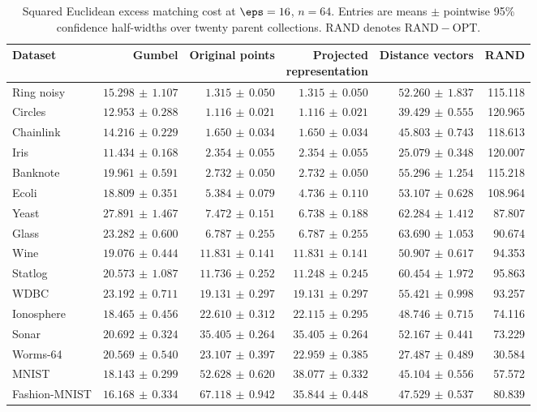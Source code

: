 \begin{table}[p]
\centering\scriptsize
\setlength{\tabcolsep}{3pt}
\caption{Squared Euclidean excess matching cost at $\eps=16$, $n=64$. Entries are means $\pm$ pointwise 95\% confidence half-widths over twenty parent collections. RAND denotes $\mathrm{RAND}-\mathrm{OPT}$.}
\label{tab:exp-bench-p2-eps16}
\begin{tabular}{lrrrrr}
\toprule
Dataset & Gumbel & Original points & \shortstack{Projected\\representation} & Distance vectors & RAND\\
\midrule
Ring noisy & $15.298\,\pm\,1.107$ & $1.315\,\pm\,0.050$ & $1.315\,\pm\,0.050$ & $52.260\,\pm\,1.837$ & 115.118\\
Circles & $12.953\,\pm\,0.288$ & $1.116\,\pm\,0.021$ & $1.116\,\pm\,0.021$ & $39.429\,\pm\,0.555$ & 120.965\\
Chainlink & $14.216\,\pm\,0.229$ & $1.650\,\pm\,0.034$ & $1.650\,\pm\,0.034$ & $45.803\,\pm\,0.743$ & 118.613\\
Iris & $11.434\,\pm\,0.168$ & $2.354\,\pm\,0.055$ & $2.354\,\pm\,0.055$ & $25.079\,\pm\,0.348$ & 120.007\\
Banknote & $19.961\,\pm\,0.591$ & $2.732\,\pm\,0.050$ & $2.732\,\pm\,0.050$ & $55.296\,\pm\,1.254$ & 115.218\\
Ecoli & $18.809\,\pm\,0.351$ & $5.384\,\pm\,0.079$ & $4.736\,\pm\,0.110$ & $53.107\,\pm\,0.628$ & 108.964\\
Yeast & $27.891\,\pm\,1.467$ & $7.472\,\pm\,0.151$ & $6.738\,\pm\,0.188$ & $62.284\,\pm\,1.412$ & 87.807\\
Glass & $23.282\,\pm\,0.600$ & $6.787\,\pm\,0.255$ & $6.787\,\pm\,0.255$ & $63.690\,\pm\,1.053$ & 90.674\\
Wine & $19.076\,\pm\,0.444$ & $11.831\,\pm\,0.141$ & $11.831\,\pm\,0.141$ & $50.907\,\pm\,0.617$ & 94.353\\
Statlog & $20.573\,\pm\,1.087$ & $11.736\,\pm\,0.252$ & $11.248\,\pm\,0.245$ & $60.454\,\pm\,1.972$ & 95.863\\
WDBC & $23.192\,\pm\,0.711$ & $19.131\,\pm\,0.297$ & $19.131\,\pm\,0.297$ & $55.421\,\pm\,0.998$ & 93.257\\
Ionosphere & $18.465\,\pm\,0.456$ & $22.610\,\pm\,0.312$ & $22.115\,\pm\,0.295$ & $48.746\,\pm\,0.715$ & 74.116\\
Sonar & $20.692\,\pm\,0.324$ & $35.405\,\pm\,0.264$ & $35.405\,\pm\,0.264$ & $52.167\,\pm\,0.441$ & 73.229\\
Worms-64 & $20.569\,\pm\,0.540$ & $23.107\,\pm\,0.397$ & $22.959\,\pm\,0.385$ & $27.487\,\pm\,0.489$ & 30.584\\
MNIST & $18.143\,\pm\,0.299$ & $52.628\,\pm\,0.620$ & $38.077\,\pm\,0.332$ & $45.104\,\pm\,0.556$ & 57.572\\
Fashion-MNIST & $16.168\,\pm\,0.334$ & $67.118\,\pm\,0.942$ & $35.844\,\pm\,0.448$ & $47.529\,\pm\,0.537$ & 80.839\\
\bottomrule
\end{tabular}
\end{table}

